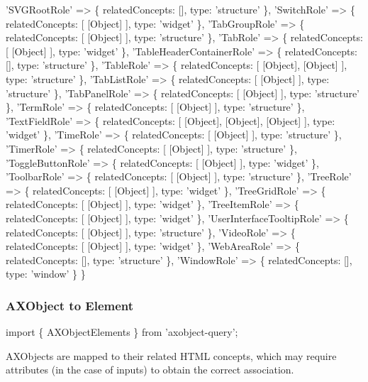 \begin{DoxyCode}
  'SVGRootRole' => \{ relatedConcepts: [], type: 'structure' \},
  'SwitchRole' => \{ relatedConcepts: [ [Object] ], type: 'widget' \},
  'TabGroupRole' => \{ relatedConcepts: [ [Object] ], type: 'structure' \},
  'TabRole' => \{ relatedConcepts: [ [Object] ], type: 'widget' \},
  'TableHeaderContainerRole' => \{ relatedConcepts: [], type: 'structure' \},
  'TableRole' => \{ relatedConcepts: [ [Object], [Object] ], type: 'structure' \},
  'TabListRole' => \{ relatedConcepts: [ [Object] ], type: 'structure' \},
  'TabPanelRole' => \{ relatedConcepts: [ [Object] ], type: 'structure' \},
  'TermRole' => \{ relatedConcepts: [ [Object] ], type: 'structure' \},
  'TextFieldRole' => \{ relatedConcepts: [ [Object], [Object], [Object] ], type: 'widget' \},
  'TimeRole' => \{ relatedConcepts: [ [Object] ], type: 'structure' \},
  'TimerRole' => \{ relatedConcepts: [ [Object] ], type: 'structure' \},
  'ToggleButtonRole' => \{ relatedConcepts: [ [Object] ], type: 'widget' \},
  'ToolbarRole' => \{ relatedConcepts: [ [Object] ], type: 'structure' \},
  'TreeRole' => \{ relatedConcepts: [ [Object] ], type: 'widget' \},
  'TreeGridRole' => \{ relatedConcepts: [ [Object] ], type: 'widget' \},
  'TreeItemRole' => \{ relatedConcepts: [ [Object] ], type: 'widget' \},
  'UserInterfaceTooltipRole' => \{ relatedConcepts: [ [Object] ], type: 'structure' \},
  'VideoRole' => \{ relatedConcepts: [ [Object] ], type: 'widget' \},
  'WebAreaRole' => \{ relatedConcepts: [], type: 'structure' \},
  'WindowRole' => \{ relatedConcepts: [], type: 'window' \}
\}
\end{DoxyCode}


\subsubsection*{A\+X\+Object to Element}


\begin{DoxyCode}
import \{ AXObjectElements \} from 'axobject-query';
\end{DoxyCode}


A\+X\+Objects are mapped to their related H\+T\+ML concepts, which may require attributes (in the case of inputs) to obtain the correct association.


